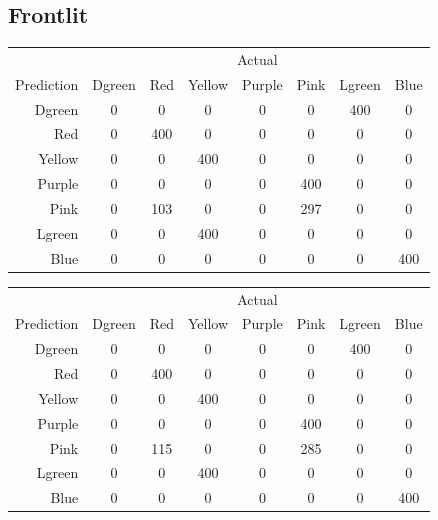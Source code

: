 \documentclass[12pt]{article}
\begin{document}
\subsection*{Frontlit}
\begin{center}
    \begin{tabular}{r|ccccccc}
	& \multicolumn{7}{c}{Actual} \\ 
    Prediction      & Dgreen & Red & Yellow & Purple & Pink & Lgreen & Blue \\ \hline
    Dgreen & 0      & 0   & 0      & 0      & 0    & 400    & 0    \\
    Red    & 0      & 400 & 0      & 0      & 0    & 0      & 0    \\
    Yellow & 0      & 0   & 400    & 0      & 0    & 0      & 0    \\
    Purple & 0      & 0   & 0      & 0      & 400  & 0      & 0    \\
    Pink   & 0      & 103 & 0      & 0      & 297  & 0      & 0    \\
    Lgreen & 0      & 0   & 400    & 0      & 0    & 0      & 0    \\
    Blue   & 0      & 0   & 0      & 0      & 0    & 0      & 400  \\
    \end{tabular}

\vspace{1em}

    \begin{tabular}{r|ccccccc}
	& \multicolumn{7}{c}{Actual} \\ 
    Prediction      & Dgreen & Red & Yellow & Purple & Pink & Lgreen & Blue \\ \hline
    Dgreen & 0      & 0   & 0      & 0      & 0    & 400    & 0    \\
    Red    & 0      & 400 & 0      & 0      & 0    & 0      & 0    \\
    Yellow & 0      & 0   & 400    & 0      & 0    & 0      & 0    \\
    Purple & 0      & 0   & 0      & 0      & 400  & 0      & 0    \\
    Pink   & 0      & 115 & 0      & 0      & 285  & 0      & 0    \\
    Lgreen & 0      & 0   & 400    & 0      & 0    & 0      & 0    \\
    Blue   & 0      & 0   & 0      & 0      & 0    & 0      & 400  \\
    \end{tabular}
\end{center}
\end{document}
